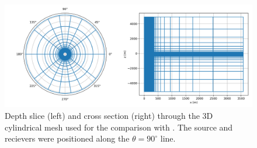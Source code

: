 \begin{figure}
    \begin{center}
    \includegraphics[width=\columnwidth]{figures/casing_software/commer_mesh.png}
    \end{center}
\caption{Depth slice (left) and cross section (right) through the 3D cylindrical mesh used for the comparison with \cite{Commer2015}. The source and recievers were positioned along the $\theta = 90^\circ$ line.}
\label{fig:commer_mesh}
\end{figure}
